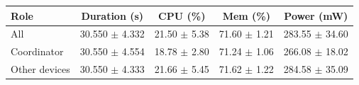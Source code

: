 \begin{tabular}{lcccc}
\hline
\textbf{Role} & \textbf{Duration (s)} & \textbf{CPU (\%)} & \textbf{Mem (\%)} & \textbf{Power (mW)} \\
\hline
All & 30.550 $\pm$ 4.332 & 21.50 $\pm$ 5.38 & 71.60 $\pm$ 1.21 & 283.55 $\pm$ 34.60 \\
Coordinator & 30.550 $\pm$ 4.554 & 18.78 $\pm$ 2.80 & 71.24 $\pm$ 1.06 & 266.08 $\pm$ 18.02 \\
Other devices & 30.550 $\pm$ 4.333 & 21.66 $\pm$ 5.45 & 71.62 $\pm$ 1.22 & 284.58 $\pm$ 35.09 \\
\hline
\end{tabular}

